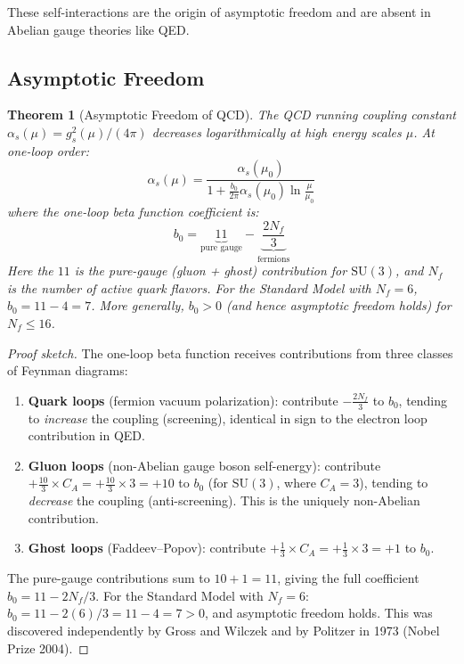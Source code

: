 \documentclass[12pt]{article}
\newtheorem{theorem}{Theorem}[section]
\theoremstyle{definition}
\theoremstyle{remark}
\begin{document}
These self-interactions are the origin of asymptotic freedom and are absent in Abelian gauge theories like QED.

\subsection{Asymptotic Freedom}

\begin{theorem}[Asymptotic Freedom of QCD]
\label{thm:asymptoticfreedom}
The QCD running coupling constant $\alpha_s(\mu) = g_s^2(\mu)/(4\pi)$ decreases logarithmically at high energy scales $\mu$. At one-loop order:
\begin{equation}
\label{eq:runningcoupling}
\alpha_s(\mu) = \frac{\alpha_s(\mu_0)}{1 + \frac{b_0}{2\pi}\alpha_s(\mu_0)\ln\frac{\mu}{\mu_0}}
\end{equation}
where the one-loop beta function coefficient is:
\begin{equation}
b_0 = \underbrace{11}_{\text{pure gauge}} - \underbrace{\frac{2N_f}{3}}_{\text{fermions}}
\end{equation}
Here the $11$ is the pure-gauge (gluon + ghost) contribution for $\mathrm{SU}(3)$, and $N_f$ is the number of active quark flavors. For the Standard Model with $N_f = 6$, $b_0 = 11 - 4 = 7$. More generally, $b_0 > 0$ (and hence asymptotic freedom holds) for $N_f \leq 16$.
\end{theorem}

\begin{proof}[Proof sketch]
The one-loop beta function receives contributions from three classes of Feynman diagrams:
\begin{enumerate}
    \item \textbf{Quark loops} (fermion vacuum polarization): contribute $-\frac{2N_f}{3}$ to $b_0$, tending to \emph{increase} the coupling (screening), identical in sign to the electron loop contribution in QED.
    \item \textbf{Gluon loops} (non-Abelian gauge boson self-energy): contribute $+\frac{10}{3} \times C_A = +\frac{10}{3} \times 3 = +10$ to $b_0$ (for $\mathrm{SU}(3)$, where $C_A = 3$), tending to \emph{decrease} the coupling (anti-screening). This is the uniquely non-Abelian contribution.
    \item \textbf{Ghost loops} (Faddeev--Popov): contribute $+\frac{1}{3} \times C_A = +\frac{1}{3} \times 3 = +1$ to $b_0$.
\end{enumerate}
The pure-gauge contributions sum to $10 + 1 = 11$, giving the full coefficient $b_0 = 11 - 2N_f/3$. For the Standard Model with $N_f = 6$: $b_0 = 11 - 2(6)/3 = 11 - 4 = 7 > 0$, and asymptotic freedom holds. This was discovered independently by Gross and Wilczek and by Politzer in 1973 (Nobel Prize 2004).
\end{proof}
\end{document}
